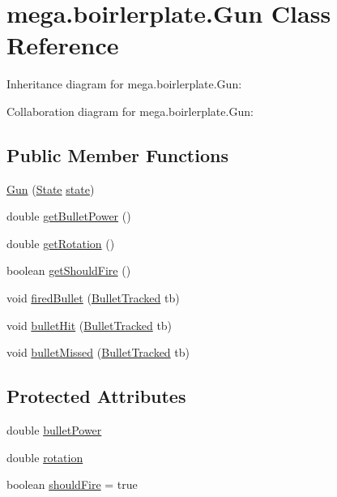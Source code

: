 \hypertarget{classmega_1_1boirlerplate_1_1_gun}{}\section{mega.\+boirlerplate.\+Gun Class Reference}
\label{classmega_1_1boirlerplate_1_1_gun}


Inheritance diagram for mega.\+boirlerplate.\+Gun\+:


Collaboration diagram for mega.\+boirlerplate.\+Gun\+:
\subsection*{Public Member Functions}
\begin{DoxyCompactItemize}
\item 
\hyperlink{classmega_1_1boirlerplate_1_1_gun_a023388651f9929428cdc9519a5b16a42}{Gun} (\hyperlink{classmega_1_1boirlerplate_1_1_state}{State} \hyperlink{classmega_1_1boirlerplate_1_1_component_a87b0d70f323b5fee60a200e07c9c20fd}{state})
\item 
double \hyperlink{classmega_1_1boirlerplate_1_1_gun_a42bc32a089d174c7d18d932e349cd7a7}{get\+Bullet\+Power} ()
\item 
double \hyperlink{classmega_1_1boirlerplate_1_1_gun_a0fdb9fc6e7c7756de11c783df6c3d90e}{get\+Rotation} ()
\item 
boolean \hyperlink{classmega_1_1boirlerplate_1_1_gun_ad920c032dd47ee1a80635f7fcb71e47c}{get\+Should\+Fire} ()
\item 
void \hyperlink{classmega_1_1boirlerplate_1_1_gun_ab4997b55572602cc55d0b66a517af126}{fired\+Bullet} (\hyperlink{classmega_1_1boirlerplate_1_1_bullet_tracked}{Bullet\+Tracked} tb)
\item 
void \hyperlink{classmega_1_1boirlerplate_1_1_gun_a5d2c92e177f15f759fa0f7041189704b}{bullet\+Hit} (\hyperlink{classmega_1_1boirlerplate_1_1_bullet_tracked}{Bullet\+Tracked} tb)
\item 
void \hyperlink{classmega_1_1boirlerplate_1_1_gun_aad5eb4b0ea58655dbc1c37fcfde5c321}{bullet\+Missed} (\hyperlink{classmega_1_1boirlerplate_1_1_bullet_tracked}{Bullet\+Tracked} tb)
\end{DoxyCompactItemize}
\subsection*{Protected Attributes}
\begin{DoxyCompactItemize}
\item 
double \hyperlink{classmega_1_1boirlerplate_1_1_gun_a874ce5b2384de7ee92c67d56c60fa083}{bullet\+Power}
\item 
double \hyperlink{classmega_1_1boirlerplate_1_1_gun_ad5615ea434efe7faedcb5b15d9e80e03}{rotation}
\item 
boolean \hyperlink{classmega_1_1boirlerplate_1_1_gun_a33502b9a7774f1681ea2f105f7c2211a}{should\+Fire} = true
\end{DoxyCompactItemize}


